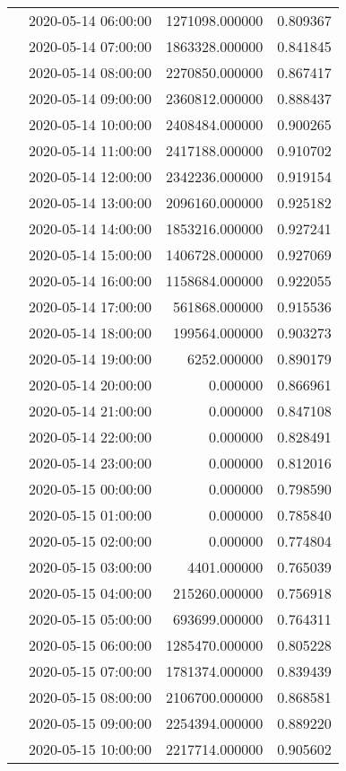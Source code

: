 \begin{tabular}{llrr}
 & 2020-05-14 06:00:00 & 1271098.000000 & 0.809367 \\
 & 2020-05-14 07:00:00 & 1863328.000000 & 0.841845 \\
 & 2020-05-14 08:00:00 & 2270850.000000 & 0.867417 \\
 & 2020-05-14 09:00:00 & 2360812.000000 & 0.888437 \\
 & 2020-05-14 10:00:00 & 2408484.000000 & 0.900265 \\
 & 2020-05-14 11:00:00 & 2417188.000000 & 0.910702 \\
 & 2020-05-14 12:00:00 & 2342236.000000 & 0.919154 \\
 & 2020-05-14 13:00:00 & 2096160.000000 & 0.925182 \\
 & 2020-05-14 14:00:00 & 1853216.000000 & 0.927241 \\
 & 2020-05-14 15:00:00 & 1406728.000000 & 0.927069 \\
 & 2020-05-14 16:00:00 & 1158684.000000 & 0.922055 \\
 & 2020-05-14 17:00:00 & 561868.000000 & 0.915536 \\
 & 2020-05-14 18:00:00 & 199564.000000 & 0.903273 \\
 & 2020-05-14 19:00:00 & 6252.000000 & 0.890179 \\
 & 2020-05-14 20:00:00 & 0.000000 & 0.866961 \\
 & 2020-05-14 21:00:00 & 0.000000 & 0.847108 \\
 & 2020-05-14 22:00:00 & 0.000000 & 0.828491 \\
 & 2020-05-14 23:00:00 & 0.000000 & 0.812016 \\
 & 2020-05-15 00:00:00 & 0.000000 & 0.798590 \\
 & 2020-05-15 01:00:00 & 0.000000 & 0.785840 \\
 & 2020-05-15 02:00:00 & 0.000000 & 0.774804 \\
 & 2020-05-15 03:00:00 & 4401.000000 & 0.765039 \\
 & 2020-05-15 04:00:00 & 215260.000000 & 0.756918 \\
 & 2020-05-15 05:00:00 & 693699.000000 & 0.764311 \\
 & 2020-05-15 06:00:00 & 1285470.000000 & 0.805228 \\
 & 2020-05-15 07:00:00 & 1781374.000000 & 0.839439 \\
 & 2020-05-15 08:00:00 & 2106700.000000 & 0.868581 \\
 & 2020-05-15 09:00:00 & 2254394.000000 & 0.889220 \\
 & 2020-05-15 10:00:00 & 2217714.000000 & 0.905602 \\

\end{tabular}
